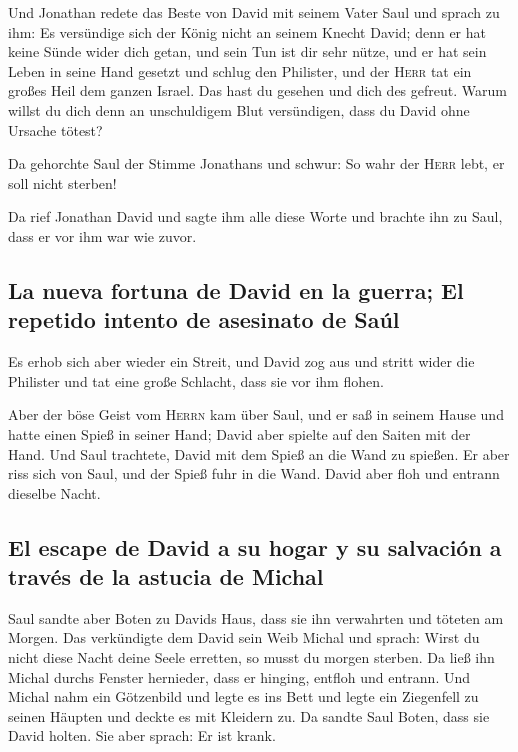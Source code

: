  Und Jonathan redete das Beste von David mit seinem Vater
Saul und sprach zu ihm: Es versündige sich der König nicht an seinem
Knecht David; denn er hat keine Sünde wider dich getan, und sein Tun ist
dir sehr nütze,  und er hat sein Leben in seine Hand
gesetzt und schlug den Philister, und der \textsc{Herr} tat ein großes
Heil dem ganzen Israel. Das hast du gesehen und dich des gefreut. Warum
willst du dich denn an unschuldigem Blut versündigen, dass du David ohne
Ursache tötest?

 Da gehorchte Saul der Stimme Jonathans und schwur: So
wahr der \textsc{Herr} lebt, er soll nicht sterben!

 Da rief Jonathan David und sagte ihm alle diese Worte und
brachte ihn zu Saul, dass er vor ihm war wie zuvor.

\hypertarget{la-nueva-fortuna-de-david-en-la-guerra-el-repetido-intento-de-asesinato-de-sauxfal}{%
\subsection{La nueva fortuna de David en la guerra; El repetido intento
de asesinato de
Saúl}\label{la-nueva-fortuna-de-david-en-la-guerra-el-repetido-intento-de-asesinato-de-sauxfal}}

 Es erhob sich aber wieder ein Streit, und David zog aus
und stritt wider die Philister und tat eine große Schlacht, dass sie vor
ihm flohen.

 Aber der böse Geist vom \textsc{Herrn} kam über Saul, und
er saß in seinem Hause und hatte einen Spieß in seiner Hand; David aber
spielte auf den Saiten mit der Hand.  Und Saul trachtete,
David mit dem Spieß an die Wand zu spießen. Er aber riss sich von Saul,
und der Spieß fuhr in die Wand. David aber floh und entrann dieselbe
Nacht.

\hypertarget{el-escape-de-david-a-su-hogar-y-su-salvaciuxf3n-a-travuxe9s-de-la-astucia-de-michal}{%
\subsection{El escape de David a su hogar y su salvación a través de la
astucia de
Michal}\label{el-escape-de-david-a-su-hogar-y-su-salvaciuxf3n-a-travuxe9s-de-la-astucia-de-michal}}

 Saul sandte aber Boten zu Davids Haus, dass sie ihn
verwahrten und töteten am Morgen. Das verkündigte dem David sein Weib
Michal und sprach: Wirst du nicht diese Nacht deine Seele erretten, so
musst du morgen sterben.  Da ließ ihn Michal durchs
Fenster hernieder, dass er hinging, entfloh und entrann. 
Und Michal nahm ein Götzenbild und legte es ins Bett und legte ein
Ziegenfell zu seinen Häupten und deckte es mit Kleidern zu.
 Da sandte Saul Boten, dass sie David holten. Sie aber
sprach: Er ist krank.

